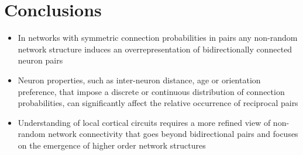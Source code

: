 \section*{Conclusions}

\begin{itemize}
  \item In networks with symmetric connection probabilities in pairs any non-random network structure induces an overrepresentation of bidirectionally connected neuron pairs
  \item Neuron properties, such as inter-neuron distance, age or orientation preference, that impose a discrete or continuous distribution of connection probabilities, can significantly affect the relative occurrence of reciprocal pairs
  \item Understanding of local cortical circuits requires a more refined view of non-random network connectivity that goes beyond bidirectional pairs and focuses on the emergence of higher order network structures
\end{itemize}

